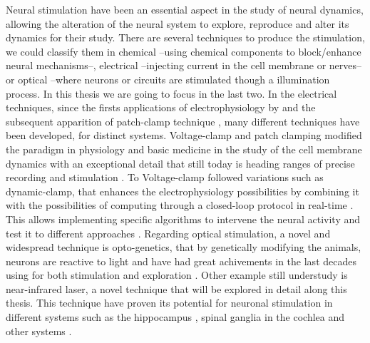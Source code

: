 Neural stimulation have been an essential aspect in the study of neural dynamics, allowing the alteration of the neural system to explore, reproduce and alter its dynamics for their study. There are several techniques to produce the stimulation, we could classify them in chemical --using chemical components to block/enhance neural mechanisms--, electrical --injecting current in the cell membrane or nerves-- or optical --where neurons or circuits are stimulated though a illumination process. In this thesis we are going to focus in the last two. In the electrical techniques, since the firsts applications of electrophysiology by \cite{neher_single-channel_1976} and the subsequent apparition of patch-clamp technique \cite{hamill_improved_1981}, many different techniques have been developed, for distinct systems. Voltage-clamp and patch clamping modified the paradigm in physiology and basic medicine in the study of the cell membrane dynamics with an exceptional detail that still today is heading ranges of precise recording and stimulation \parencite{hamill_improved_1981}. To Voltage-clamp followed variations such as dynamic-clamp, that enhances the electrophysiology possibilities by combining it with the possibilities of computing through a closed-loop protocol in real-time \parencite{nowotny_dynamic_2022}. This allows implementing specific algorithms to intervene the neural activity and test it to different approaches \parencite{chamorro_generalization_2012}. 
Regarding optical stimulation, a novel and widespread technique is opto-genetics, that by genetically modifying the animals, neurons are reactive to light and have had great achivements in the last decades using for both stimulation and exploration \parencite{chen_roles_2022}. Other example still understudy is near-infrared laser, a novel technique that will be explored in detail along this thesis. This technique have proven its potential for neuronal stimulation in different systems such as the hippocampus \parencite{liang_temperature-dependent_2009}, spinal ganglia in the cochlea \cite{goyal_acute_2012, barrett_pulsed_2018, brown_thermal_2020} and other systems \parencite{shapiro_infrared_2012, cayce_infrared_2014, begeng_activity_2022}.

%

